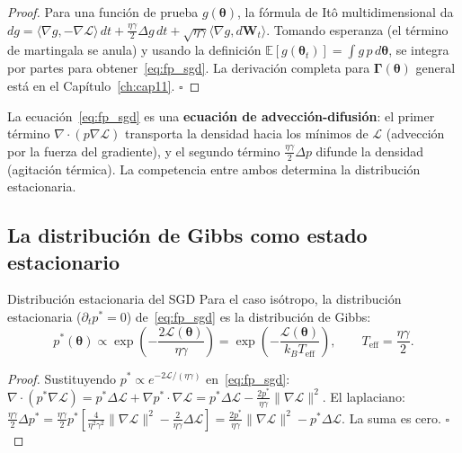 \begin{proof}
Para una función de prueba $g(\bm{\theta})$, la fórmula de Itô
multidimensional da
$dg = \langle\nabla g, -\nabla\mathcal{L}\rangle\,dt +
\frac{\eta\gamma}{2}\Delta g\,dt + \sqrt{\eta\gamma}\langle\nabla g,
d\bm{W}_t\rangle$.
Tomando esperanza (el término de martingala se anula) y usando la
definición $\mathbb{E}[g(\bm{\theta}_t)] = \int g\,p\,d\bm{\theta}$,
se integra por partes para obtener~\eqref{eq:fp_sgd}. La derivación
completa para $\bm{\Gamma}(\bm{\theta})$ general está en el
Capítulo~\ref{ch:cap11}. $\square$
\end{proof}

La ecuación~\eqref{eq:fp_sgd} es una \textbf{ecuación de
advección-difusión}: el primer término
$\nabla\cdot(p\nabla\mathcal{L})$ transporta la densidad hacia los
mínimos de $\mathcal{L}$ (advección por la fuerza del gradiente), y el
segundo término $\frac{\eta\gamma}{2}\Delta p$ difunde la densidad
(agitación térmica). La competencia entre ambos determina la distribución
estacionaria.

\subsection{La distribución de Gibbs como estado estacionario}
\label{subsec:gibbs_sgd}

\begin{proposicion}{Distribución estacionaria del SGD}
\label{prop:gibbs_sgd}
Para el caso isótropo, la distribución estacionaria
($\partial_t p^* = 0$) de~\eqref{eq:fp_sgd} es la distribución de
Gibbs:
\begin{equation}
  p^*(\bm{\theta}) \propto
  \exp\!\left(-\frac{2\mathcal{L}(\bm{\theta})}{\eta\gamma}\right)
  = \exp\!\left(-\frac{\mathcal{L}(\bm{\theta})}{k_BT_{\text{eff}}}\right),
  \qquad T_{\text{eff}} = \frac{\eta\gamma}{2}.
  \label{eq:gibbs_sgd}
\end{equation}
\end{proposicion}

\begin{proof}
Sustituyendo $p^* \propto e^{-2\mathcal{L}/(\eta\gamma)}$
en~\eqref{eq:fp_sgd}: $\nabla\cdot(p^*\nabla\mathcal{L}) =
p^*\Delta\mathcal{L} + \nabla p^*\cdot\nabla\mathcal{L} =
p^*\Delta\mathcal{L} - \frac{2p^*}{\eta\gamma}\|\nabla\mathcal{L}\|^2$.
El laplaciano: $\frac{\eta\gamma}{2}\Delta p^* =
\frac{\eta\gamma}{2}p^*[\frac{4}{\eta^2\gamma^2}\|\nabla\mathcal{L}\|^2
- \frac{2}{\eta\gamma}\Delta\mathcal{L}] =
\frac{2p^*}{\eta\gamma}\|\nabla\mathcal{L}\|^2 -
p^*\Delta\mathcal{L}$. La suma es cero. $\square$
\end{proof}

